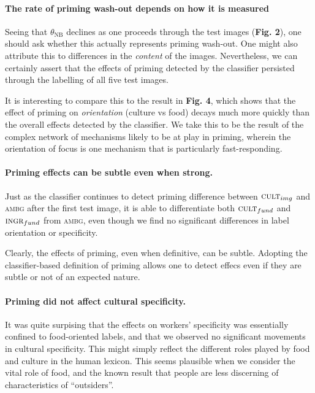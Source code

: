 \documentclass[a4paper]{report}
\begin{document}
\paragraph{The rate of priming wash-out depends on how it is measured}
Seeing that $\theta_\text{NB}$ declines as one proceeds through the test 
images (\textbf{Fig. 2}), one should ask whether this actually represents 
priming wash-out.  One might also attribute this to 
differences in the \textit{content} of the images.  Nevertheless, we can
certainly assert that the effects of priming detected by the classifier 
persisted through the labelling of all five test images.  

It is interesting to compare this to the result in \textbf{Fig. 4}, which
shows that the effect of priming on \textit{orientation} (culture vs food) 
decays much more quickly than the overall effects detected by
the classifier.  We take this to be the result of the complex network of 
mechanisms likely to be at play in priming, wherein the orientation of focus
is one mechanism that is particularly fast-responding.


\paragraph{Priming effects can be subtle even when strong.}
Just as the classifier continues to detect priming difference between 
$\textsc{cult}_{img}$ and \textsc{ambg} after the first test image,
it is able to differentiate both $\textsc{cult}_{fund}$ and 
$\textsc{ingr}_{fund}$ from \textsc{ambg}, even though we find no significant
differences in label orientation or specificity.  

Clearly, the effects of
priming, even when definitive, can be subtle. Adopting the classifier-based
definition of priming allows one to detect effecs even if they are subtle or
not of an expected nature.

\paragraph{Priming did not affect cultural specificity.}
It was quite surpising that the effects on workers' specificity was essentially
confined to food-oriented labels, and that we observed no significant movements
in cultural specificity.   This might simply reflect the different roles
played by food and culture in the human lexicon.  This seems plausible when we 
consider the vital role of food, and the known result that people are less
discerning of characteristics of ``outsiders''.
\end{document}
